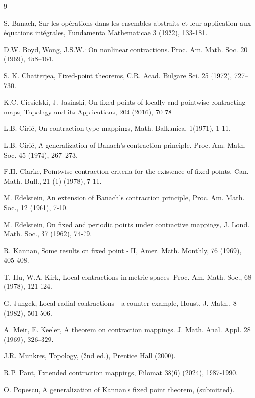 \documentclass[12 pt]{article}
\theoremstyle{lema}
\theoremstyle{proposition}
\theoremstyle{theorem}
\theoremstyle{theorem}
\theoremstyle{corollary}
\theoremstyle{definition}
\theoremstyle{example}
\begin{document}
	
	\begin{thebibliography}{9}
		
	
		S. Banach, Sur les opérations dans les ensembles abstraits et leur application aux équations intégrales, Fundamenta Mathematicae 3 (1922), 133-181.
		
		D.W. Boyd, Wong, J.S.W.: On nonlinear contractions. Proc. Am. Math. Soc. 20 (1969), 458–464.
		
		S. K. Chatterjea, Fixed-point theorems, C.R. Acad. Bulgare Sci. 25 (1972), 727–730.
		
		K.C. Ciesielski, J. Jasinski, On fixed points of locally and pointwise contracting maps, Topology and its Applications, 204 (2016), 70-78.
		
		L.B. Ciri\'c, On contraction type mappings, Math. Balkanica, 1(1971), 1-11.
		
		L.B. Ciri\'c, A generalization of Banach’s contraction principle. Proc. Am. Math. Soc. 45 (1974), 267–273.
		
		F.H. Clarke, Pointwise contraction criteria for the existence of fixed points, Can. Math. Bull., 21 (1) (1978), 7-11.
		
		M. Edelstein, An extension of Banach's contraction principle, Proc. Am. Math. Soc., 12 (1961), 7-10.
		
		M. Edelstein, On fixed and periodic points under contractive mappings, J. Lond. Math. Soc., 37 (1962), 74-79.
		
		R. Kannan, Some results on fixed point - II, Amer. Math. Monthly, 76 (1969), 405-408.
		
		T. Hu, W.A. Kirk, Local contractions in metric spaces, Proc. Am. Math. Soc., 68 (1978), 121-124.
		
		G. Jungck, Local radial contractions—a counter-example, Houst. J. Math., 8 (1982), 501-506.
		
		A. Meir, E. Keeler, A theorem on contraction mappings. J. Math. Anal. Appl. 28 (1969), 326–329.
		
		J.R. Munkres, Topology, (2nd ed.), Prentice Hall (2000).
		
		R.P. Pant, Extended contraction mappings, Filomat 38(6) (2024), 1987-1990.
		
		O. Popescu, A generalization of Kannan's fixed point theorem, (submitted).
		

\end{thebibliography}
\end{document}
